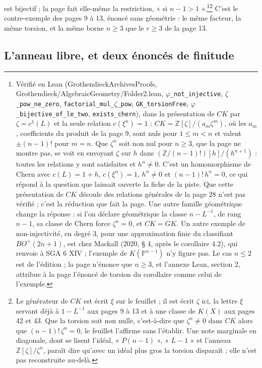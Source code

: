 \documentclass[11pt,a4paper]{article}
\begin{document}
est bijectif ; la page fait elle-même la restriction, « si $n-1>1$ ».\footnote{Vérifié en Lean
(GrothendieckArchivesProofs, Grothendieck/AlgebraicGeometry/Folder2.lean, \texttt{$\varphi$\_not\_injective},
\texttt{$\zeta$\_pow\_ne\_zero}, \texttt{factorial\_mul\_$\zeta$\_pow},
\texttt{GK\_torsionFree}, \texttt{$\varphi$\_bijective\_of\_le\_two},
\texttt{exists\_chern}), dans la présentation de $CK$ par $\zeta = c^{1}(L)$ et
la seule relation $c(\xi^{n}) = 1$ : $CK = \mathbb{Z}[\zeta]/(a_{m}\zeta^{m})$, où
les $a_{m}$, coefficients du produit de la page 9, sont nuls pour $1 \leqslant m
< n$ et valent $\pm(n-1)!$ pour $m = n$. Que $\zeta^{n}$ soit non nul pour $n
\geqslant 3$, que la page ne montre pas, se voit en envoyant $\zeta$ sur $h$ dans
$(\mathbb{Z}/(n-1)!)[h]/(h^{n+1})$ : toutes les relations y sont satisfaites et
$h^{n} \neq 0$. C'est un homomorphisme de Chern avec $c(L) = 1 + h$,
$c(\xi^{n}) = 1$, $h^{n} \neq 0$ et $(n-1)!\,h^{n} = 0$, ce qui répond à la
question que laissait ouverte la fiche de la piste. Que cette présentation de
$CK$ découle des relations générales de la page 28 n'est pas vérifié ; c'est la
réduction que fait la page. Une autre famille géométrique change la réponse : si
l'on déclare géométrique la classe $n - L^{-1}$, de rang $n - 1$, sa classe de
Chern force $\zeta^{n} = 0$, et $CK = GK$. Un autre exemple de non-injectivité,
en degré 3, pour une approximation finie du classifiant $BO^{+}(2n+1)$, est
chez Mackall (2020, § 4, après le corollaire 4.2), qui renvoie à SGA 6 XIV ;
l'exemple de $K(\mathbb{P}^{n-1})$ n'y figure pas. Le cas $n \leqslant 2$ est
de l'édition ; la page n'énonce que $n \geqslant 3$, et l'annexe Lean,
section 2, attribue à la page l'énoncé de torsion du corollaire comme celui de
l'exemple.}\footnote{Le générateur de
$CK$ est écrit $\xi$ sur le feuillet ; il est écrit $\zeta$ ici, la lettre
$\xi$ servant déjà à $1 - L^{-1}$ aux pages 9 à 13 et à une classe de $K(X)$
aux pages 42 et 43. Que la torsion soit non nulle, c'est-à-dire que $\zeta^{n} \neq 0$
dans $CK$ alors que $(n-1)!\,\zeta^{n} = 0$, le feuillet l'affirme sans
l'établir. Une note marginale en diagonale, dont se lisent l'idéal,
« $P(n-1)$ », « $L-1$ » et l'anneau $\mathbb{Z}[\zeta]/\zeta^{n}$, paraît dire
qu'avec un idéal plus gros la torsion disparaît ; elle n'est pas reconstruite
au-delà.} C'est le contre-exemple des pages 9 à 13, énoncé sans géométrie : le même
facteur, la même torsion, et la même borne $n \geqslant 3$ que le
$r \geqslant 3$ de la page 13.

\subsection*{L'anneau libre, et deux énoncés de finitude}
\end{document}
